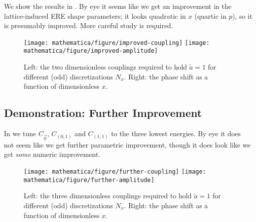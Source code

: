 We show the results in .
By eye it seems like we get an improvement in the lattice-induced ERE shape parameters; it looks quadratic in $x$ (quartic in $p$), so it is presumably improved.
More careful study is required.

\begin{figure}
	\texttt{[image: mathematica/figure/improved-coupling]}
	\texttt{[image: mathematica/figure/improved-amplitude]}
	\caption{
		Left: the two dimensionless couplings required to hold $\tilde{a}=1$ for different (odd) discretizations $N_x$.
		Right: the phase shift as a function of dimensionless $x$.
	}
    \label{fig:tune two spheres}
\end{figure}

\subsection{Demonstration: Further Improvement}

In  we tune $C_{\vec{0}}$, $C_{(0,1)}$ and $C_{(1,1)}$ to the three lowest energies.
By eye it does not seem like we get further parametric improvement, though it does look like we get \emph{some} numeric improvement.

\begin{figure}
	\texttt{[image: mathematica/figure/further-coupling]}
	\texttt{[image: mathematica/figure/further-amplitude]}
	\caption{
		Left: the three dimensionless couplings required to hold $\tilde{a}=1$ for different (odd) discretizations $N_x$.
		Right: the phase shift as a function of dimensionless $x$.
	}
    \label{fig:tune three spheres}
\end{figure}


